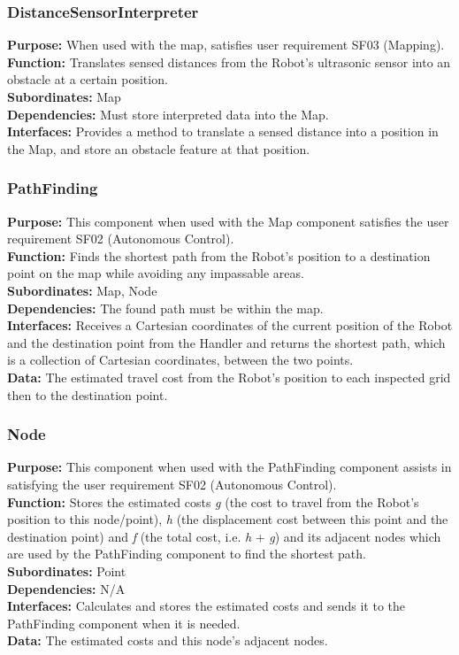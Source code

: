 \documentclass[12pt,a4paper]{article}
\begin{document}
\subsubsection{DistanceSensorInterpreter}
	\textbf{Purpose:} When used with the map, satisfies user requirement SF03 (Mapping).\\
	\textbf{Function:} Translates sensed distances from the Robot's ultrasonic sensor into an obstacle at a certain position.\\
	\textbf{Subordinates:} Map\\
	\textbf{Dependencies:} Must store interpreted data into the Map.\\
	\textbf{Interfaces:} Provides a method to translate a sensed distance into a position in the Map, and store an obstacle feature at that position.\\

\subsubsection{PathFinding}
	\textbf{Purpose:} This component when used with the Map component satisfies the user requirement SF02 (Autonomous Control).\\
	\textbf{Function:} Finds the shortest path from the Robot's position to a destination point on the map while avoiding any impassable areas.\\
	\textbf{Subordinates:} Map, Node\\
	\textbf{Dependencies:} The found path must be within the map.\\
	\textbf{Interfaces:} Receives a Cartesian coordinates of the current position of the Robot and the destination point from the Handler and returns the shortest path, which is a collection of Cartesian coordinates, between the two points.\\
    \textbf{Data:} The estimated travel cost from the Robot's position to each inspected grid then to the destination point.\\
    
\subsubsection{Node}
	\textbf{Purpose:} This component when used with the PathFinding component assists in satisfying the user requirement SF02 (Autonomous Control).\\
	\textbf{Function:} Stores the estimated costs \textit{g} (the cost to travel from the Robot's position to this node/point), \textit{h} (the displacement cost between this point and the destination point) and \textit{f} (the total cost, i.e. \textit{h} + \textit{g}) and its adjacent nodes which are used by the PathFinding component to find the shortest path.\\
	\textbf{Subordinates:} Point\\
	\textbf{Dependencies:} N/A\\
	\textbf{Interfaces:} Calculates and stores the estimated costs and sends it to the PathFinding component when it is needed.\\
    \textbf{Data:} The estimated costs and this node's adjacent nodes.\\
\end{document}
